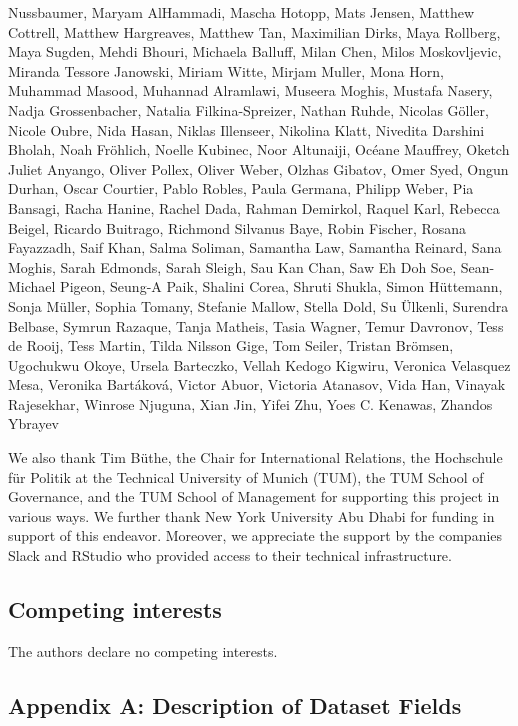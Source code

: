 \documentclass[
]{article}
\begin{document}
Nussbaumer, Maryam AlHammadi, Mascha Hotopp, Mats Jensen, Matthew Cottrell, Matthew Hargreaves, Matthew Tan, Maximilian Dirks, Maya Rollberg, Maya Sugden, Mehdi Bhouri, Michaela Balluff, Milan Chen, Milos Moskovljevic, Miranda Tessore Janowski, Miriam Witte, Mirjam Muller, Mona Horn, Muhammad Masood, Muhannad Alramlawi, Museera Moghis, Mustafa Nasery, Nadja Grossenbacher, Natalia Filkina-Spreizer, Nathan Ruhde, Nicolas Göller, Nicole Oubre, Nida Hasan, Niklas Illenseer, Nikolina Klatt, Nivedita Darshini Bholah, Noah Fröhlich, Noelle Kubinec, Noor Altunaiji, Océane Mauffrey, Oketch Juliet Anyango, Oliver Pollex, Oliver Weber, Olzhas Gibatov, Omer Syed, Ongun Durhan, Oscar Courtier, Pablo Robles, Paula Germana, Philipp Weber, Pia Bansagi, Racha Hanine, Rachel Dada, Rahman Demirkol, Raquel Karl, Rebecca Beigel, Ricardo Buitrago, Richmond Silvanus Baye, Robin Fischer, Rosana Fayazzadh, Saif Khan, Salma Soliman, Samantha Law, Samantha Reinard, Sana Moghis, Sarah Edmonds, Sarah Sleigh, Sau Kan Chan, Saw Eh Doh Soe, Sean-Michael Pigeon, Seung-A Paik, Shalini Corea, Shruti Shukla, Simon Hüttemann, Sonja Müller, Sophia Tomany, Stefanie Mallow, Stella Dold, Su Ülkenli, Surendra Belbase, Symrun Razaque, Tanja Matheis, Tasia Wagner, Temur Davronov, Tess de Rooij, Tess Martin, Tilda Nilsson Gige, Tom Seiler, Tristan Brömsen, Ugochukwu Okoye, Ursela Barteczko, Vellah Kedogo Kigwiru, Veronica Velasquez Mesa, Veronika Bartáková, Victor Abuor, Victoria Atanasov, Vida Han, Vinayak Rajesekhar, Winrose Njuguna, Xian Jin, Yifei Zhu, Yoes C. Kenawas, Zhandos Ybrayev

We also thank Tim Büthe, the Chair for International Relations, the Hochschule für Politik at the Technical University of Munich (TUM), the TUM School of Governance, and the TUM School of Management for supporting this project in various ways. We further thank New York University Abu Dhabi for funding in support of this endeavor. Moreover, we appreciate the support by the companies Slack and RStudio who provided access to their technical infrastructure.

\hypertarget{competing-interests}{%
\subsection*{Competing interests}\label{competing-interests}}

The authors declare no competing interests.

\hypertarget{appendix-a-description-of-dataset-fields}{%
\subsection*{Appendix A: Description of Dataset Fields}\label{appendix-a-description-of-dataset-fields}}
\end{document}
